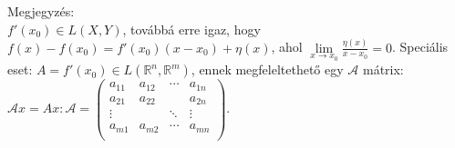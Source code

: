 \documentclass[12pt,a4paper]{scrartcl}
\newenvironment{megjegyzes}{}{}
\begin{document}
\begin{megjegyzes}

Megjegyzés:\\
\(f'\left( x_{0} \right) \in L\left( {X,Y} \right)\), továbbá erre igaz,
hogy
\(f\left( x \right) - f\left( x_{0} \right) = f'\left( x_{0} \right)\left( {x - x_{0}} \right) + \eta\left( x \right)\),
ahol
\(\underset{x\rightarrow x_{0}}{\lim}\frac{\eta\left( x \right)}{x - x_{0}} = 0\).
Speciális eset:
\(A = f'\left( x_{0} \right) \in L\left( {{\mathbb{R}}^{n},{\mathbb{R}}^{m}} \right)\),
ennek megfeleltethető egy \(\mathcal{A}\) mátrix:
\(\mathcal{A}x = Ax:\mathcal{A} = \left( \begin{array}{llll} a_{11} & a_{12} & \cdots & a_{1n} \\ a_{21} & a_{22} & & a_{2n} \\  \vdots & & \ddots & \vdots \\ a_{m1} & a_{m2} & \cdots & a_{mn} \\ \end{array} \right)\).

\end{megjegyzes}
\end{document}
